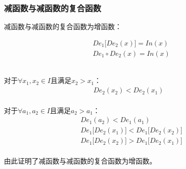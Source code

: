\documentclass[UTF8]{ctexart}
\begin{document}
\subsubsection{减函数与减函数的复合函数}
    \setcounter{equation}{0}
    减函数与减函数的复合函数为增函数：
    \begin{large}
        \begin{align*}
            &De_1\big[De_2(x)\big]=In(x)\\[3mm]
            &De_1\circ De_2(x)=In(x)
        \end{align*}
    \end{large}\\
    对于$\forall x_1,x_2\in I$且满足$x_2>x_1$：
    \begin{align}
        De_2(x_2)<De_2(x_1)
    \end{align}\\
    对于$\forall a_1,a_2\in I$且满足$a_2>a_1$：
    \begin{align}
        &De_1(a_2)<De_1(a_1)\\[3mm]
        &De_1\big[De_2(x_1)\big]<De_1\big[De_2(x_2)\big]\\[3mm]
        &De_1\big[De_2(x_2)\big]>De_1\big[De_2(x_1)\big]
    \end{align}\\
    由此证明了减函数与减函数的复合函数为增函数。

\newpage
\end{document}
